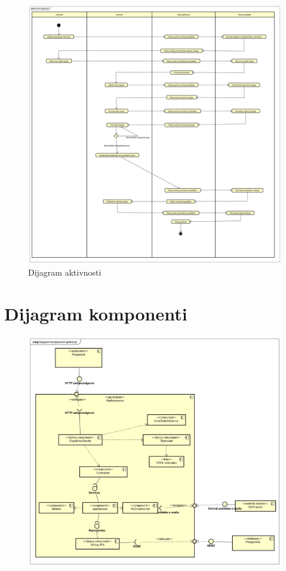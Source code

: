 			 \begin{figure}[H]
			 	\centering
			 	\includegraphics[width=1.0\linewidth]{dijagrami/activity-diagram-v2}
			 	\caption{Dijagram aktivnosti}
			 	\label{fig:actdiag}
			 \end{figure}
			
			\eject
		\section{Dijagram komponenti}
%		
%		


		\begin{figure}
			\centering
			\includegraphics[width=1.0\linewidth]{dijagrami/component_diagram}
			\caption{}
			\label{fig:componentdiagram}
		\end{figure}

